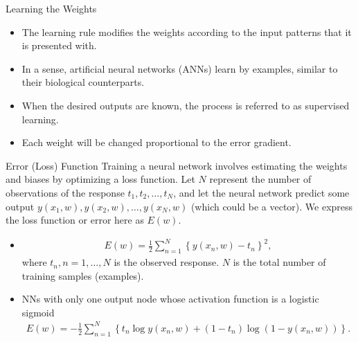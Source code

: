 \documentclass[10pt, hyperref={colorlinks = true,linkcolor = blue}]{beamer}
\begin{document}
{{{\begin{frame}{Learning the Weights}
\begin{itemize}
    \item The learning rule modifies the weights according to the input patterns that it is presented with.
    \item In a sense, artificial neural networks (ANNs) learn by examples, similar to their biological counterparts.
    \item When the desired outputs are known, the process is referred to as supervised learning.
    \item Each weight will be changed proportional to the error gradient.
\end{itemize}
\end{frame}

\begin{frame}{Error (Loss) Function}
  Training a neural network involves estimating the weights and biases by optimizing a loss function. Let \( N \) represent the number of observations of the response \( t_1, t_2, \ldots, t_N \), and let the neural network predict some output \( {y}(x_1, w), {y}(x_2, w), \ldots, {y}(x_N, w) \) (which could be a vector). We express the loss function or error here as \( E(w) \).
\begin{itemize}
\item {\color{purple}{Regression:}} {\color{red}{Sum of squared}} 
\begin{align*}
E( w) = \frac{1}{2} \sum_{n=1}^{N} \left\{y(x_n, w)- t_n\right\}^2,
\end{align*}
where $t_n, n=1,\ldots,N$ is the observed response. $N$ is the total number of training samples (examples).
\item {\color{purple}{Binary classification:}} NNs with only one output node whose activation function is a logistic sigmoid {\color{red}{Cross-entropy error function}} 
\begin{align*}
E(w) = -\frac{1}{2} \sum_{n=1}^{N} \left\{ t_n\log y( x_n, w) + (1-t_n) \log(1 - y( x_n, w)) \right\}. 
\end{align*}
\end{itemize}
\end{frame}


}}}
\end{document}
